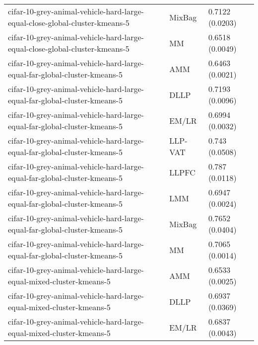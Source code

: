 \begin{longtable}{lll}
                                  cifar-10-grey-animal-vehicle-hard-large-equal-close-global-cluster-kmeans-5 &    MixBag &                           0.7122 (0.0203) \\
                                  cifar-10-grey-animal-vehicle-hard-large-equal-close-global-cluster-kmeans-5 &        MM &                           0.6518 (0.0049) \\
                                    cifar-10-grey-animal-vehicle-hard-large-equal-far-global-cluster-kmeans-5 &       AMM &                           0.6463 (0.0021) \\
                                    cifar-10-grey-animal-vehicle-hard-large-equal-far-global-cluster-kmeans-5 &      DLLP &                           0.7193 (0.0096) \\
                                    cifar-10-grey-animal-vehicle-hard-large-equal-far-global-cluster-kmeans-5 &     EM/LR &                           0.6994 (0.0032) \\
                                    cifar-10-grey-animal-vehicle-hard-large-equal-far-global-cluster-kmeans-5 &   LLP-VAT &                            0.743 (0.0508) \\
                                    cifar-10-grey-animal-vehicle-hard-large-equal-far-global-cluster-kmeans-5 &     LLPFC &                            0.787 (0.0118) \\
                                    cifar-10-grey-animal-vehicle-hard-large-equal-far-global-cluster-kmeans-5 &       LMM &                           0.6947 (0.0024) \\
                                    cifar-10-grey-animal-vehicle-hard-large-equal-far-global-cluster-kmeans-5 &    MixBag &                           0.7652 (0.0404) \\
                                    cifar-10-grey-animal-vehicle-hard-large-equal-far-global-cluster-kmeans-5 &        MM &                           0.7065 (0.0014) \\
                                         cifar-10-grey-animal-vehicle-hard-large-equal-mixed-cluster-kmeans-5 &       AMM &                           0.6533 (0.0025) \\
                                         cifar-10-grey-animal-vehicle-hard-large-equal-mixed-cluster-kmeans-5 &      DLLP &                           0.6937 (0.0369) \\
                                         cifar-10-grey-animal-vehicle-hard-large-equal-mixed-cluster-kmeans-5 &     EM/LR &                           0.6837 (0.0043) \\

\end{longtable}
